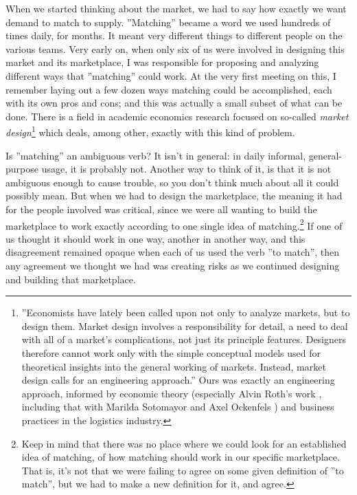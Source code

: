 \documentclass[graybox,envcountchap,sectrefs]{svmono}
\begin{document}
When we started thinking about the market, we had to say how exactly we want demand to match to supply. ''Matching'' became a word we used hundreds of times daily,  for months. It meant very different things to different people on the various teams. Very early on, when only six of us were involved in designing this market and its marketplace, I was responsible for proposing and analyzing different ways that ''matching'' could work. At the very first meeting on this, I remember laying out a few dozen ways matching could be accomplished, each with its own pros and cons; and this was actually a small subset of what can be done. There is a field in academic economics research focused on so-called \textit{market design}\footnote{''Economists have lately been called upon not only to analyze markets, but to design them. Market design involves a responsibility for detail, a need to deal with all of a market's complications, not just its principle features. Designers therefore cannot work only with the simple conceptual models used for theoretical insights into the general working of markets. Instead, market design calls for an engineering approach.'' \cite{roth2002economist} Ours was exactly an engineering approach, informed by economic theory (especially Alvin Roth's work \cite{roth2002economist}, including that with Marilda Sotomayor \cite{roth1992two} and Axel Ockenfels \cite{roth2002last}) and business practices in the logistics industry.} which deals, among other, exactly with this kind of problem.

Is ''matching'' an ambiguous verb? It isn't in general: in daily informal, general-purpose usage, it is probably not. Another way to think of it, is that it is not ambiguous enough to cause trouble, so you don't think much about all it could possibly mean. But when we had to design the marketplace, the meaning it had for the people involved was critical, since we were all wanting to build the marketplace to work exactly according to one single idea of matching.\footnote{Keep in mind that there was no place where we could look for an established idea of matching, of how matching should work in our specific marketplace. That is, it's not that we were failing to agree on some given definition of ''to match'', but we had to make a new definition for it, and agree.} If one of us thought it should work in one way, another in another way, and this disagreement remained opaque when each of us used the verb ''to match'', then any agreement we thought we had was creating risks as we continued designing and building that marketplace.
\end{document}
